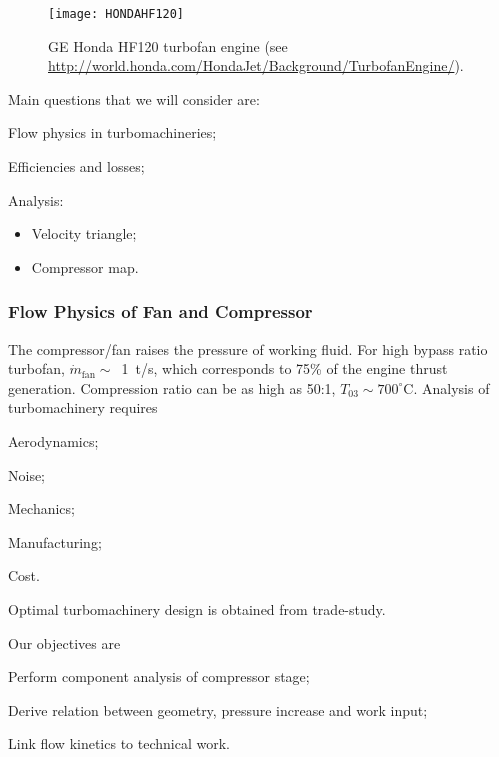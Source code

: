 \begin{figure}[!htb!]
 \centering
    {\texttt{[image: HONDAHF120]}}
    \caption{\label{FIG_HONDAHF120}GE Honda HF120 turbofan engine (see \url{http://world.honda.com/HondaJet/Background/TurbofanEngine/}).}
\end{figure}

Main questions that we will consider are:
\begin{itemizePacked}
\item Flow physics in turbomachineries;
\item Efficiencies and losses;
\item Analysis:
  \begin{itemize}
  \item Velocity triangle;
  \item Compressor map.
  \end{itemize}
\end{itemizePacked}

\subsubsection{Flow Physics of Fan and Compressor}
The compressor/fan raises the pressure of working fluid. For high bypass ratio turbofan, $\dot{m}_\text{fan} \sim$~1~t/s, which corresponds to 75\% of the engine thrust generation. Compression ratio can be as high as 50:1, $T_{03} \sim 700^\circ$C. Analysis of turbomachinery requires
\begin{itemizePacked}
\item Aerodynamics;
\item Noise;
\item Mechanics;
\item Manufacturing;
\item Cost.
\end{itemizePacked}
Optimal turbomachinery design is obtained from trade-study.

Our objectives are
\begin{itemizePacked}
\item Perform component analysis of compressor stage;
\item Derive relation between geometry, pressure increase and work input;
\item Link flow kinetics to technical work.
\end{itemizePacked}

